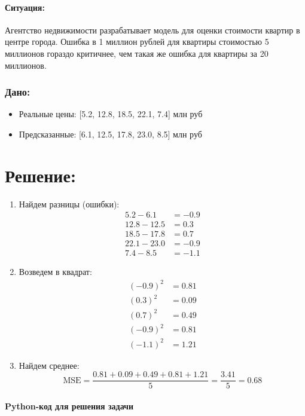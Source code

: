 \paragraph{Ситуация:} Агентство недвижимости разрабатывает модель для оценки стоимости квартир в центре города. Ошибка в 1 миллион рублей для квартиры стоимостью 5 миллионов гораздо критичнее, чем такая же ошибка для квартиры за 20 миллионов.

\subsubsection*{Дано:}
\begin{itemize}
    \item Реальные цены: [5.2, 12.8, 18.5, 22.1, 7.4] млн руб
    \item Предсказанные: [6.1, 12.5, 17.8, 23.0, 8.5] млн руб
\end{itemize}


\section*{Решение:}

\begin{enumerate}
    \item {Найдем разницы (ошибки):}
    \[
    \begin{aligned}
    5.2 - 6.1 &= -0.9 \\
    12.8 - 12.5 &= 0.3 \\
    18.5 - 17.8 &= 0.7 \\
    22.1 - 23.0 &= -0.9 \\
    7.4 - 8.5 &= -1.1
    \end{aligned}
    \]

    \item {Возведем в квадрат:}
    \[
    \begin{aligned}
    (-0.9)^2 &= 0.81 \\
    (0.3)^2 &= 0.09 \\
    (0.7)^2 &= 0.49 \\
    (-0.9)^2 &= 0.81 \\
    (-1.1)^2 &= 1.21
    \end{aligned}
    \]

    \item {Найдем среднее:}
    \[
    \text{MSE} = \frac{0.81 + 0.09 + 0.49 + 0.81 + 1.21}{5} = \frac{3.41}{5} = 0.68
    \]
\end{enumerate}

\paragraph*{Python-код для решения задачи}

